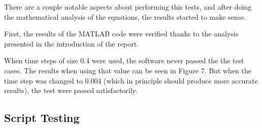 \documentclass[12pt,a4paper]{article}
\begin{document}
There are a couple notable aspects about performing this tests, and after doing the mathematical analysis of the equations, the results started to make sense. 

First, the results of the MATLAB code were verified thanks to the analysis presented in the introduction of the report.

When time steps of size 0.4 were used, the software never passed the the test cases. The results when using that value can be seen in Figure 7. But when the time step was changed to 0.004 (which in principle should produce more accurate results), the test were passed satisfactorily. 





\subsection{Script Testing}

\end{document}
